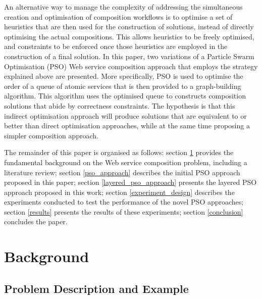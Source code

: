 \documentclass{llncs}
\begin{document}
An alternative way to manage the complexity of addressing the simultaneous creation and optimisation of composition workflows is to optimise a set of heuristics that are then used for the construction of solutions, instead of directly optimising the actual compositions. This allows heuristics to be freely optimised, and constraints to be enforced once those heuristics are employed in the construction of a final solution. In this paper, two variations of a Particle Swarm Optimisation (PSO) \cite{eberhart2001particle} Web service composition approach that employs the strategy explained above are presented. More specifically, PSO is used to optimise the order of a queue of atomic services that is then provided to a graph-building algorithm. This algorithm uses the optimised queue to constructs composition solutions that abide by correctness constraints. The hypothesis is that this indirect optimisation approach will produce solutions that are equivalent to or better than direct optimisation approaches, while at the same time proposing a simpler composition approach.

The remainder of this paper is organised as follows: section \ref{background} provides the fundamental background on the Web service composition problem, including a literature review; section \ref{pso_approach} describes the initial PSO approach proposed in this paper; section \ref{layered_pso_approach} presents the layered PSO approach proposed in this work; section \ref{experiment_design} describes the experiments conducted to test the performance of the novel PSO approaches; section \ref{results} presents the results of these experiments; section \ref{conclusion} concludes the paper.

\section{Background}\label{background}

\subsection{Problem Description and Example}
\end{document}
